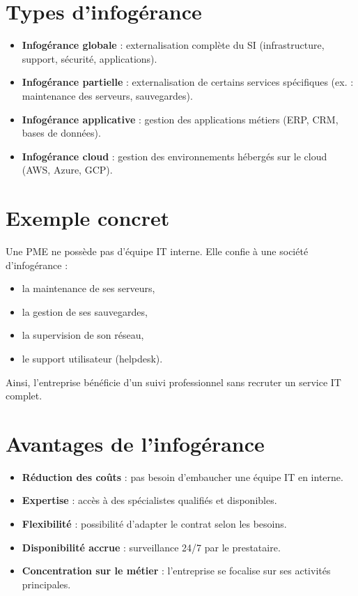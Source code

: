 \documentclass[a4paper,11pt]{article}
\begin{document}
\section*{Types d’infogérance}

\begin{tcolorbox}[title={Différentes formes}]
\begin{itemize}
  \item \textbf{Infogérance globale} : externalisation complète du SI (infrastructure, support, sécurité, applications).
  \item \textbf{Infogérance partielle} : externalisation de certains services spécifiques (ex. : maintenance des serveurs, sauvegardes).
  \item \textbf{Infogérance applicative} : gestion des applications métiers (ERP, CRM, bases de données).
  \item \textbf{Infogérance cloud} : gestion des environnements hébergés sur le cloud (AWS, Azure, GCP).
\end{itemize}
\end{tcolorbox}

\section*{Exemple concret}

\begin{tcolorbox}[title={Exemple}]
Une PME ne possède pas d’équipe IT interne.  
Elle confie à une société d’infogérance :
\begin{itemize}
  \item la maintenance de ses serveurs,
  \item la gestion de ses sauvegardes,
  \item la supervision de son réseau,
  \item le support utilisateur (helpdesk).
\end{itemize}
Ainsi, l’entreprise bénéficie d’un suivi professionnel sans recruter un service IT complet.
\end{tcolorbox}

\section*{Avantages de l’infogérance}

\begin{tcolorbox}[title={Bénéfices}]
\begin{itemize}
  \item \textbf{Réduction des coûts} : pas besoin d’embaucher une équipe IT en interne.
  \item \textbf{Expertise} : accès à des spécialistes qualifiés et disponibles.
  \item \textbf{Flexibilité} : possibilité d’adapter le contrat selon les besoins.
  \item \textbf{Disponibilité accrue} : surveillance 24/7 par le prestataire.
  \item \textbf{Concentration sur le métier} : l’entreprise se focalise sur ses activités principales.
\end{itemize}
\end{tcolorbox}
\end{document}
